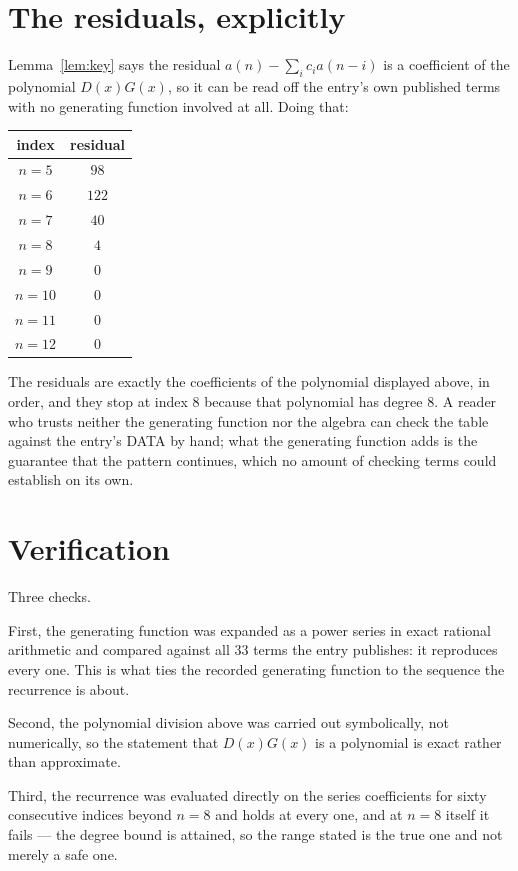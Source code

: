 \documentclass[11pt,a4paper]{article}
\theoremstyle{plain}
\theoremstyle{definition}
\begin{document}
\section{The residuals, explicitly}

Lemma~\ref{lem:key} says the residual $a(n)-\sum_ic_ia(n-i)$ is a coefficient of the
polynomial $D(x)G(x)$, so it can be read off the entry's own published terms with no
generating function involved at all. Doing that:
\begin{center}
\begin{tabular}{cc}
index & residual \\ \hline
$n=5$ & $98$ \\
$n=6$ & $122$ \\
$n=7$ & $40$ \\
$n=8$ & $4$ \\
$n=9$ & $0$ \\
$n=10$ & $0$ \\
$n=11$ & $0$ \\
$n=12$ & $0$
\end{tabular}
\end{center}
The residuals are exactly the coefficients of the polynomial displayed above, in order, and
they stop at index $8$ because that polynomial has degree $8$. A reader who trusts
neither the generating function nor the algebra can check the table against the entry's DATA
by hand; what the generating function adds is the guarantee that the pattern continues, which
no amount of checking terms could establish on its own.

\section{Verification}

Three checks.

First, the generating function was expanded as a power series in exact rational arithmetic and
compared against all $33$ terms the entry publishes: it reproduces every one. This is
what ties the recorded generating function to the sequence the recurrence is about.

Second, the polynomial division above was carried out symbolically, not numerically, so the
statement that $D(x)G(x)$ is a polynomial is exact rather than approximate.

Third, the recurrence was evaluated directly on the series coefficients for sixty consecutive
indices beyond $n=8$ and holds at every one, and at $n=8$ itself it fails --- the
degree bound is attained, so the range stated is the true one and not merely a safe one.
\end{document}
